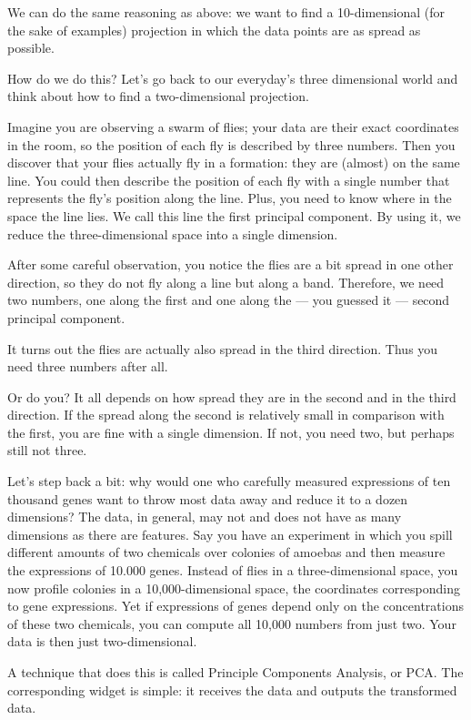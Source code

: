 We can do the same reasoning as above: we want to find a 10-dimensional (for the sake of examples) projection in which the data  points are as spread as possible.

How do we do this? Let's go back to our everyday's three dimensional world and think about how to find a two-dimensional projection.

Imagine you are observing a swarm of flies; your data are their exact coordinates in the room, so the position of each fly is described by three numbers. Then you discover that your flies actually fly in a formation: they are (almost) on the same line. You could then describe the position of each fly with a single number that represents the fly's position along the line. Plus, you need to know where in the space the line lies. We call this line the first principal component. By using it, we reduce the three-dimensional space into a single dimension.

After some careful observation, you notice the flies are a bit spread in one other direction, so they do not fly along a line but along a band. Therefore, we need two numbers, one along the first and one along the — you guessed it — second principal component.

It turns out the flies are actually also spread in the third direction. Thus you need three numbers after all.

Or do you? It all depends on how spread they are in the second and in the third direction. If the spread along the second is relatively small in comparison with the first, you are fine with a single dimension. If not, you need two, but perhaps still not three.

Let's step back a bit: why would one who carefully measured expressions of ten thousand genes want to throw most data away and reduce it to a dozen dimensions? The data, in general, may not and does not have as many dimensions as there are features. Say you have an experiment in which you spill different amounts of two chemicals over colonies of amoebas and then measure the expressions of 10.000 genes. Instead of flies in a three-dimensional space, you now profile colonies in a 10,000-dimensional space, the coordinates corresponding to gene expressions. Yet if expressions of genes depend only on the concentrations of these two chemicals, you can compute all 10,000 numbers from just two. Your data is then just two-dimensional.

\newpage

A technique that does this is called Principle Components Analysis, or PCA. The corresponding widget is simple: it receives the data and outputs the transformed data.


